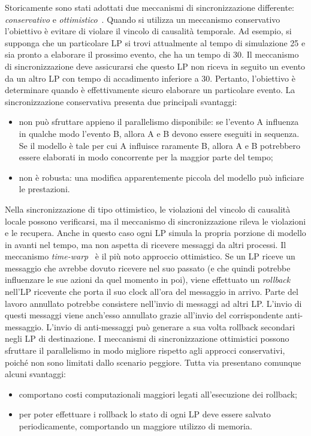 \documentclass[12pt,a4paper,openright,twoside]{book}
\begin{document}
Storicamente sono stati adottati due meccanismi di sincronizzazione differente: \textit{conservativo} e \textit{ottimistico}~\cite{DBLP:conf/wsc/Fujimoto95}.
Quando si utilizza un meccanismo conservativo l'obiettivo è evitare di violare il vincolo di causalità temporale. Ad esempio, si supponga che un particolare LP si trovi attualmente al tempo di simulazione 25 e sia pronto a elaborare il prossimo evento, che ha un tempo di 30. Il meccanismo di sincronizzazione deve assicurarsi che questo LP non riceva in seguito un evento da un altro LP con tempo di accadimento inferiore a 30. Pertanto, l'obiettivo è determinare quando è effettivamente sicuro elaborare un particolare evento. 
La sincronizzazione conservativa presenta due principali svantaggi: 
\begin{itemize}
    \item non può sfruttare appieno il parallelismo disponibile: se l'evento A influenza in qualche modo l'evento B, allora A e B devono essere eseguiti in sequenza. Se il modello è tale per cui A influisce raramente B, allora A e B potrebbero essere elaborati in modo concorrente per la maggior parte del tempo;
    \item non è robusta: una modifica apparentemente piccola del modello può inficiare le prestazioni. 
\end{itemize}
Nella sincronizzazione di tipo ottimistico, le violazioni del vincolo di causalità locale possono verificarsi, ma il meccanismo di sincronizzazione rileva le violazioni e le recupera. Anche in questo caso ogni LP simula la propria porzione di modello in avanti nel tempo, ma non aspetta di ricevere messaggi da altri processi. 
Il meccanismo \textit{time-warp}~\cite{DBLP:journals/toplas/Jefferson85} è il più noto approccio ottimistico. Se un LP riceve un messaggio che avrebbe dovuto ricevere nel suo passato (e che quindi potrebbe influenzare le sue azioni da quel momento in poi), viene effettuato un \textit{rollback} nell'LP ricevente che porta il suo clock all'ora del messaggio in arrivo.
Parte del lavoro annullato potrebbe consistere nell'invio di messaggi ad altri LP. L'invio di questi messaggi viene anch'esso annullato grazie all'invio del corrispondente anti-messaggio. L'invio di anti-messaggi può generare a sua volta rollback secondari negli LP di destinazione.
I meccanismi di sincronizzazione ottimistici possono sfruttare il parallelismo in modo migliore rispetto agli approcci conservativi, poiché non sono limitati dallo scenario peggiore. Tutta via presentano comunque alcuni svantaggi: 
\begin{itemize}
    \item comportano costi computazionali maggiori legati all'esecuzione dei rollback; 
    \item per poter effettuare i rollback lo stato di ogni LP deve essere salvato periodicamente, comportando un maggiore utilizzo di memoria.
\end{itemize}
\end{document}
